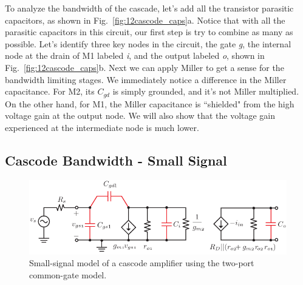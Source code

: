 To analyze the bandwidth of the cascade, let's add all the transistor parasitic capacitors, as shown in Fig.~\ref{fig:12cascode_caps}a.  Notice that with all the parasitic capacitors in this circuit, our first step is try to combine as many as possible.   Let's identify three key nodes in the circuit, the gate \emph{g}, the internal node at the drain of M1 labeled \emph{i}, and the output labeled \emph{o}, shown in Fig.~\ref{fig:12cascode_caps}b.  Next we can apply Miller to get a sense for the bandwidth limiting stages.  We immediately notice a difference in the Miller capacitance.  For M2, its $C_{gd}$ is simply grounded, and it's not Miller multiplied.  On the other hand, for M1, the Miller capacitance is ``shielded" from the high voltage gain at the output node.  We will also show that the voltage gain experienced at the intermediate node is much lower.  
 



\subsection{Cascode Bandwidth - Small Signal}


\begin{figure}[tb]
\begin{center}
\includegraphics[scale=1]{14cascode_ac_ss}
\end{center}
\caption{Small-signal model of a cascode amplifier using the two-port common-gate model.} \label{fig:14cascode_ac_ss}
\end{figure}

